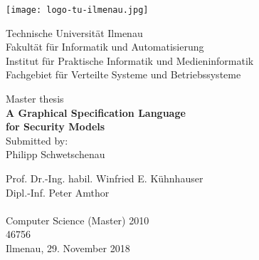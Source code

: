 \documentclass[twoside, openright, 12pt]{book}
\begin{document}
%
\begin{titlepage}
\newlength{\detailwidth}
\newlength{\detaildescriptionwidth}
\settowidth{\detailwidth}{Eingereicht:~~ Prof. Dr.-Ing. habil. Winfried E. Kühnhauser}
\settowidth{\detaildescriptionwidth}{Studies:~~} 
\begin{center}

\vfill {
	\texttt{[image: logo-tu-ilmenau.jpg]}
	\vspace{8ex}
}

\begin{normalsize}Technische Universität Ilmenau \\
Fakultät für Informatik und Automatisierung \\
Institut für Praktische Informatik und Medieninformatik \\
Fachgebiet für Verteilte Systeme und Betriebssysteme        
\end{normalsize}


\vfill {\large
	Master thesis\\ \vspace{2ex}
	\LARGE \textbf{A Graphical Specification Language \\
	for Security Models} \\ \vspace{2.5ex}
	\normalsize Submitted by: \\
	\Large Philipp Schwetschenau \\ \vspace{3ex} 
}
\vfill \parbox{\detailwidth}{
	 Prof. Dr.-Ing. habil. Winfried E. Kühnhauser \\
	 Dipl.-Inf. Peter Amthor \\
	\vspace{2ex} \\
	 Computer Science (Master) 2010\\  
	 46756  
	\vspace{2ex} \\
	 Ilmenau, 29. November 2018
}
\vspace*{\fill}
\end{center}
\end{titlepage}

\mbox{}
\thispagestyle{empty}
\cleardoublepage

\setcounter{page}{1}
\tableofcontents
\end{document}
